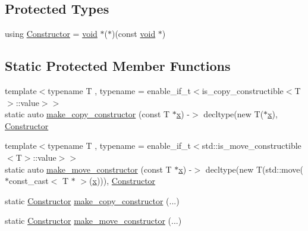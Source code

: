 \subsection*{Protected Types}
\begin{DoxyCompactItemize}
\item 
using \mbox{\hyperlink{classtype__caster__base_ab5020d71e0fb1d9e827af0f280c575ac}{Constructor}} = \mbox{\hyperlink{_s_d_l__opengles2__gl2ext_8h_ae5d8fa23ad07c48bb609509eae494c95}{void}} $\ast$($\ast$)(const \mbox{\hyperlink{_s_d_l__opengles2__gl2ext_8h_ae5d8fa23ad07c48bb609509eae494c95}{void}} $\ast$)
\end{DoxyCompactItemize}
\subsection*{Static Protected Member Functions}
\begin{DoxyCompactItemize}
\item 
{\footnotesize template$<$typename T , typename  = enable\+\_\+if\+\_\+t$<$is\+\_\+copy\+\_\+constructible$<$\+T$>$\+::value$>$$>$ }\\static auto \mbox{\hyperlink{classtype__caster__base_a369831bdda16afdc431102e26553aa66}{make\+\_\+copy\+\_\+constructor}} (const T $\ast$\mbox{\hyperlink{_s_d_l__opengl_8h_ad0e63d0edcdbd3d79554076bf309fd47}{x}}) -\/$>$ decltype(new T($\ast$\mbox{\hyperlink{_s_d_l__opengl_8h_ad0e63d0edcdbd3d79554076bf309fd47}{x}}), \mbox{\hyperlink{classtype__caster__base_ab5020d71e0fb1d9e827af0f280c575ac}{Constructor}}
\item 
{\footnotesize template$<$typename T , typename  = enable\+\_\+if\+\_\+t$<$std\+::is\+\_\+move\+\_\+constructible$<$\+T$>$\+::value$>$$>$ }\\static auto \mbox{\hyperlink{classtype__caster__base_a0a667ee7f1da87bf7efd2b75d5108975}{make\+\_\+move\+\_\+constructor}} (const T $\ast$\mbox{\hyperlink{_s_d_l__opengl_8h_ad0e63d0edcdbd3d79554076bf309fd47}{x}}) -\/$>$ decltype(new T(std\+::move($\ast$const\+\_\+cast$<$ T $\ast$ $>$(\mbox{\hyperlink{_s_d_l__opengl_8h_ad0e63d0edcdbd3d79554076bf309fd47}{x}}))), \mbox{\hyperlink{classtype__caster__base_ab5020d71e0fb1d9e827af0f280c575ac}{Constructor}}
\item 
static \mbox{\hyperlink{classtype__caster__base_ab5020d71e0fb1d9e827af0f280c575ac}{Constructor}} \mbox{\hyperlink{classtype__caster__base_a8d096e63217768f54daacdfc1cfb4b22}{make\+\_\+copy\+\_\+constructor}} (...)
\item 
static \mbox{\hyperlink{classtype__caster__base_ab5020d71e0fb1d9e827af0f280c575ac}{Constructor}} \mbox{\hyperlink{classtype__caster__base_a24699183cc7c1c07c2a3de7674ca7419}{make\+\_\+move\+\_\+constructor}} (...)
\end{DoxyCompactItemize}
